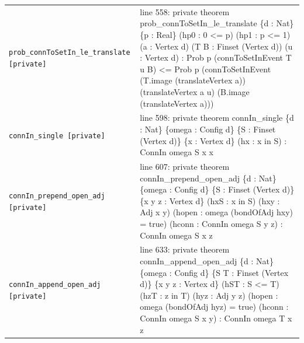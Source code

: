 \documentclass[10pt]{article}
\begin{document}
\begin{longtable}{>{\raggedright\arraybackslash}p{} >{\raggedright\arraybackslash}p{}}
\texttt{prob\_\allowbreak{}connToSetIn\_\allowbreak{}le\_\allowbreak{}translate [private]} & {\ttfamily\scriptsize line 558:\allowbreak{} private theorem prob\_\allowbreak{}connToSetIn\_\allowbreak{}le\_\allowbreak{}translate \{d :\allowbreak{} Nat\} \{p :\allowbreak{} Real\} (\allowbreak{}hp0 :\allowbreak{} 0 <=\allowbreak{} p)\allowbreak{} (\allowbreak{}hp1 :\allowbreak{} p <=\allowbreak{} 1)\allowbreak{} (\allowbreak{}a :\allowbreak{} Vertex d)\allowbreak{} (\allowbreak{}T B :\allowbreak{} Finset (\allowbreak{}Vertex d)\allowbreak{})\allowbreak{} (\allowbreak{}u :\allowbreak{} Vertex d)\allowbreak{} :\allowbreak{} Prob p (\allowbreak{}connToSetInEvent T u B)\allowbreak{} <=\allowbreak{} Prob p (\allowbreak{}connToSetInEvent (\allowbreak{}T.\allowbreak{}image (\allowbreak{}translateVertex a)\allowbreak{})\allowbreak{} (\allowbreak{}translateVertex a u)\allowbreak{} (\allowbreak{}B.\allowbreak{}image (\allowbreak{}translateVertex a)\allowbreak{})\allowbreak{})\allowbreak{}} \\[0.45em]
\texttt{connIn\_\allowbreak{}single [private]} & {\ttfamily\scriptsize line 598:\allowbreak{} private theorem connIn\_\allowbreak{}single \{d :\allowbreak{} Nat\} \{omega :\allowbreak{} Config d\} \{S :\allowbreak{} Finset (\allowbreak{}Vertex d)\allowbreak{}\} \{x :\allowbreak{} Vertex d\} (\allowbreak{}hx :\allowbreak{} x in S)\allowbreak{} :\allowbreak{} ConnIn omega S x x} \\[0.45em]
\texttt{connIn\_\allowbreak{}prepend\_\allowbreak{}open\_\allowbreak{}adj [private]} & {\ttfamily\scriptsize line 607:\allowbreak{} private theorem connIn\_\allowbreak{}prepend\_\allowbreak{}open\_\allowbreak{}adj \{d :\allowbreak{} Nat\} \{omega :\allowbreak{} Config d\} \{S :\allowbreak{} Finset (\allowbreak{}Vertex d)\allowbreak{}\} \{x y z :\allowbreak{} Vertex d\} (\allowbreak{}hxS :\allowbreak{} x in S)\allowbreak{} (\allowbreak{}hxy :\allowbreak{} Adj x y)\allowbreak{} (\allowbreak{}hopen :\allowbreak{} omega (\allowbreak{}bondOfAdj hxy)\allowbreak{} =\allowbreak{} true)\allowbreak{} (\allowbreak{}hconn :\allowbreak{} ConnIn omega S y z)\allowbreak{} :\allowbreak{} ConnIn omega S x z} \\[0.45em]
\texttt{connIn\_\allowbreak{}append\_\allowbreak{}open\_\allowbreak{}adj [private]} & {\ttfamily\scriptsize line 633:\allowbreak{} private theorem connIn\_\allowbreak{}append\_\allowbreak{}open\_\allowbreak{}adj \{d :\allowbreak{} Nat\} \{omega :\allowbreak{} Config d\} \{S T :\allowbreak{} Finset (\allowbreak{}Vertex d)\allowbreak{}\} \{x y z :\allowbreak{} Vertex d\} (\allowbreak{}hST :\allowbreak{} S <=\allowbreak{} T)\allowbreak{} (\allowbreak{}hzT :\allowbreak{} z in T)\allowbreak{} (\allowbreak{}hyz :\allowbreak{} Adj y z)\allowbreak{} (\allowbreak{}hopen :\allowbreak{} omega (\allowbreak{}bondOfAdj hyz)\allowbreak{} =\allowbreak{} true)\allowbreak{} (\allowbreak{}hconn :\allowbreak{} ConnIn omega S x y)\allowbreak{} :\allowbreak{} ConnIn omega T x z} \\[0.45em]

\end{longtable}
\end{document}

